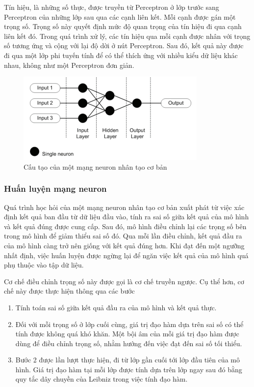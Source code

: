 Tín hiệu, là những số thực, được truyền từ Perceptron ở lớp trước sang Perceptron của những lớp sau qua các cạnh liên kết. Mỗi cạnh được gán một trọng số. Trọng số này quyết định mức độ quan trọng của tín hiệu đi qua cạnh liên kết đó. Trong quá trình xử lý, các tín hiệu qua mỗi cạnh được nhân với trọng số tương ứng và cộng với lại độ dời ở nút Perceptron. Sau đó, kết quả này được đi qua một lớp phi tuyến tính để có thể thích ứng với nhiều kiểu dữ liệu khác nhau, không như một Perceptron đơn giản.
\begin{figure}[H]
    \centering
    \includegraphics{pics/Chapter3/basicNN.png}
    \caption{Cấu tạo của một mạng neuron nhân tạo cơ bản \cite{krenker2011introduction}}
    \label{fig:enter-label}
\end{figure}
\subsubsection*{Huấn luyện mạng neuron}
Quá trình học hỏi của một mạng neuron nhân tạo cơ bản xuất phát từ việc xác định kết quả ban đầu từ dữ liệu đầu vào, tính ra sai số giữa kết quả của mô hình và kết quả đúng được cung cấp. Sau đó, mô hình điều chỉnh lại các trọng số bên trong mô hình để giảm thiểu sai số đó. Qua mỗi lần điều chỉnh, kết quả đầu ra của mô hình càng trở nên giống với kết quả đúng hơn. Khi đạt đến một ngưỡng nhất định, việc huấn luyện được ngừng lại để ngăn việc kết quả của mô hình quá phụ thuộc vào tập dữ liệu.

Cơ chế điều chỉnh trọng số này được gọi là cơ chế truyền ngược. Cụ thể hơn, cơ chế này được thực hiện thông qua các bước
\begin{enumerate}
    \item Tính toán sai số giữa kết quả đầu ra của mô hình và kết quả thực.
    \item Đối với mỗi trọng số ở lớp cuối cùng, giá trị đạo hàm dựa trên sai số có thể tính được không quá khó khăn. Một bội âm của mỗi giá trị đạo hàm được dùng để điều chỉnh trọng số, nhằm hướng đến việc đạt đến sai số tối thiểu.
    \item Bước 2 được lần lượt thực hiện, đi từ lớp gần cuối tới lớp đầu tiên của mô hình. Giá trị đạo hàm tại mỗi lớp được tính dựa trên lớp ngay sau đó bằng quy tắc dây chuyền của Leibniz trong việc tính đạo hàm.
\end{enumerate}

